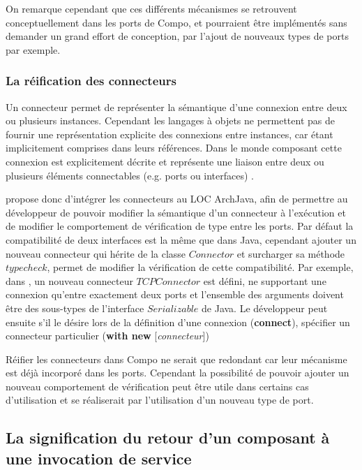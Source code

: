     On remarque cependant que ces différents mécanismes se retrouvent conceptuellement dans les ports de Compo, et pourraient être implémentés sans demander un grand effort de conception, par l'ajout de nouveaux types de ports par exemple.
    
    \subsubsection{La réification des connecteurs}
 
    Un connecteur permet de représenter la sémantique d'une connexion entre deux ou plusieurs instances. Cependant les langages à objets ne permettent pas de fournir une représentation explicite des connexions entre instances, car étant implicitement comprises dans leurs références. Dans le monde composant cette connexion est explicitement décrite et représente une liaison entre deux ou plusieurs éléments connectables (e.g. ports ou interfaces) \cite{IversDocumentingComponent2004}.
    
    \cite{DBLP:conf/ecoop/AldrichSCN03} propose donc d'intégrer les connecteurs au LOC ArchJava, afin de permettre au développeur de pouvoir modifier la sémantique d'un connecteur à l’exécution et de modifier le comportement de vérification de type entre les ports. 
    Par défaut la compatibilité de deux interfaces est la même que dans Java, cependant ajouter un nouveau connecteur qui hérite de la classe $Connector$ et surcharger sa méthode $typecheck$, permet de modifier la vérification de cette compatibilité. 
    Par exemple, dans \cite{DBLP:conf/ecoop/AldrichSCN03}, un nouveau connecteur $TCPConnector$ est défini, ne supportant une conne\-xion qu'entre exactement deux ports et l'ensemble des arguments doivent être des sous-types de l'interface $Serializable$ de Java. Le développeur peut ensuite s'il le désire lors de la définition d'une connexion (\textbf{connect}), spécifier un connecteur particulier (\textbf{with new} [{\itshape connecteur}])
    
    Réifier les connecteurs dans Compo ne serait que redondant car leur mécanisme est déjà incorporé dans les ports. Cependant la possibilité de pouvoir ajouter un nouveau comportement de vérification peut être utile dans certains cas d'utilisation et se réaliserait par l'utilisation d'un nouveau type de port. 

  \subsection{La signification du retour d'un composant à une invocation de service}
  
